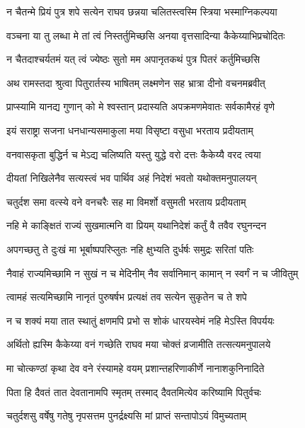 \twolineshloka
{न चैतन्मे प्रियं पुत्र शपे सत्येन राघव}
{छन्नया चलितस्त्वस्मि स्त्रिया भस्माग्निकल्पया} %

\twolineshloka
{वञ्चना या तु लब्धा मे तां त्वं निस्तर्तुमिच्छसि}
{अनया वृत्तसादिन्या कैकेय्याभिप्रचोदितः} %

\twolineshloka
{न चैतदाश्चर्यतमं यत् त्वं ज्येष्ठः सुतो मम}
{अपानृतकथं पुत्र पितरं कर्तुमिच्छसि} %

\twolineshloka
{अथ रामस्तदा श्रुत्वा पितुरार्तस्य भाषितम्}
{लक्ष्मणेन सह भ्रात्रा दीनो वचनमब्रवीत्} %

\twolineshloka
{प्राप्स्यामि यानद्य गुणान् को मे श्वस्तान् प्रदास्यति}
{अपक्रमणमेवातः सर्वकामैरहं वृणे} %

\twolineshloka
{इयं सराष्ट्रा सजना धनधान्यसमाकुला}
{मया विसृष्टा वसुधा भरताय प्रदीयताम्} %

\twolineshloka
{वनवासकृता बुद्धिर्न च मेऽद्य चलिष्यति}
{यस्तु युद्धे वरो दत्तः कैकेय्यै वरद त्वया} %

\twolineshloka
{दीयतां निखिलेनैव सत्यस्त्वं भव पार्थिव}
{अहं निदेशं भवतो यथोक्तमनुपालयन्} %

\twolineshloka
{चतुर्दश समा वत्स्ये वने वनचरैः सह}
{मा विमर्शो वसुमती भरताय प्रदीयताम्} %

\twolineshloka
{नहि मे काङ्क्षितं राज्यं सुखमात्मनि वा प्रियम्}
{यथानिदेशं कर्तुं वै तवैव रघुनन्दन} %

\twolineshloka
{अपगच्छतु ते दुःखं मा भूर्बाष्पपरिप्लुतः}
{नहि क्षुभ्यति दुर्धर्षः समुद्रः सरितां पतिः} %

\twolineshloka
{नैवाहं राज्यमिच्छामि न सुखं न च मेदिनीम्}
{नैव सर्वानिमान् कामान् न स्वर्गं न च जीवितुम्} %

\twolineshloka
{त्वामहं सत्यमिच्छामि नानृतं पुरुषर्षभ}
{प्रत्यक्षं तव सत्येन सुकृतेन च ते शपे} %

\twolineshloka
{न च शक्यं मया तात स्थातुं क्षणमपि प्रभो}
{स शोकं धारयस्वेमं नहि मेऽस्ति विपर्ययः} %

\twolineshloka
{अर्थितो ह्यस्मि कैकेय्या वनं गच्छेति राघव}
{मया चोक्तं व्रजामीति तत्सत्यमनुपालये} %

\twolineshloka
{मा चोत्कण्ठां कृथा देव वने रंस्यामहे वयम्}
{प्रशान्तहरिणाकीर्णे नानाशकुनिनादिते} %

\twolineshloka
{पिता हि दैवतं तात देवतानामपि स्मृतम्}
{तस्माद् दैवतमित्येव करिष्यामि पितुर्वचः} %

\twolineshloka
{चतुर्दशसु वर्षेषु गतेषु नृपसत्तम}
{पुनर्द्रक्ष्यसि मां प्राप्तं सन्तापोऽयं विमुच्यताम्} %

